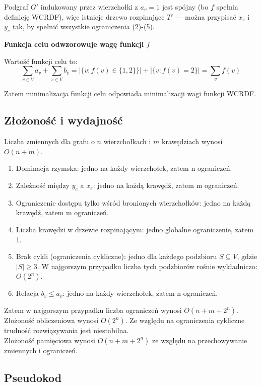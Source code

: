 Podgraf $G'$ indukowany przez wierzchołki z $a_v = 1$ jest spójny (bo $f$ spełnia definicję WCRDF), więc istnieje drzewo rozpinające $T'$ — można przypisać $x_e$ i $y_e$ tak, by spełnić wszystkie ograniczenia (2)-(5).

\textbf{Funkcja celu odwzorowuje wagę funkcji $f$}

Wartość funkcji celu to:
\[
\sum_{v \in V} a_v + \sum_{v \in V} b_v = |\{v : f(v) \in \{1,2\}\}| + |\{v : f(v) = 2\}|
= \sum_{v} f(v)
\]

Zatem minimalizacja funkcji celu odpowiada minimalizacji wagi funkcji WCRDF.

\subsection{Złożoność i wydajność}

Liczba zmiennych dla grafu o $n$ wierzchołkach i $m$ krawędziach wynosi $O(n+m)$.

\begin{enumerate}
    \item Dominacja rzymska: jedno na każdy wierzchołek, zatem  n ograniczeń.   
    \item Zależność między \( y_e \) a \( x_e \): jedno na każdą krawędź, zatem m ograniczeń.    
    \item Ograniczenie dostępu tylko wśród bronionych wierzchołków: jedno na każdą krawędź, zatem m ograniczeń.    
    \item Liczba krawędzi w drzewie rozpinającym: jedno globalne ograniczenie, zatem 1.  
    \item Brak cykli (ograniczenia cykliczne): jedno dla każdego podzbioru \( S \subseteq V \), gdzie \( |S| \geq 3 \). W najgorszym przypadku liczba tych podzbiorów rośnie wykładniczo: $O(2^n)$.  
    \item Relacja \( b_v \leq a_v \): jedno na każdy wierzchołek, zatem n ograniczeń.
\end{enumerate}

Zatem w najgorszym przypadku liczba ograniczeń wynosi $	O(n+m+2^n)$.
Złożoność obliczeniowa wynosi $O(2^n)$. Ze względu na ograniczenia cykliczne trudność rozwiązywania jest niestabilna.\\
Złożoność pamięciowa wynosi $O(n+m+2^n)$ ze względu na przechowywanie zmiennych i ograniczeń.

\subsection{Pseudokod}

